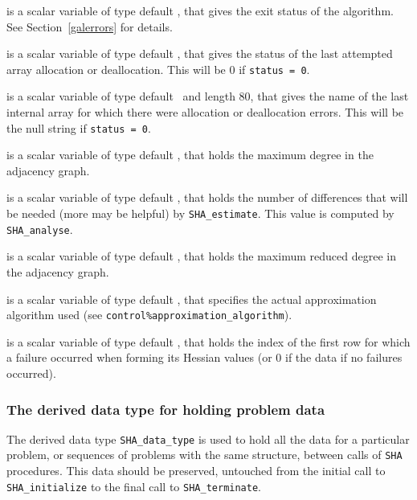 \documentclass{galahad}
\newcommand{\packagename}{SHA}
\begin{document}
\begin{description}
 is a scalar variable of type default \integer, that gives the
exit status of the algorithm. 
See Section~\ref{galerrors} for details.

 is a scalar variable of type default \integer, that gives
the status of the last attempted array allocation or deallocation.
This will be 0 if {\tt status = 0}.

 is a scalar variable of type default \character\
and length 80, that  gives the name of the last internal array 
for which there were allocation or deallocation errors.
This will be the null string if {\tt status = 0}. 

 is a scalar variable of type default \integer, 
that holds the maximum degree in the adjacency graph.

 is a scalar variable of type default \integer, 
that holds the number of differences that will be needed (more may be helpful)
by {\tt \packagename\_\-estimate}. This value is computed by
{\tt \packagename\_\-analyse}.

 is a scalar variable of type default \integer, 
that holds the maximum reduced degree in the adjacency graph.

  is a scalar variable of type 
default \integer, that specifies the actual approximation algorithm used
(see {\tt control\%approximation\_algorithm}).

 is a scalar variable of type default \integer, that holds the 
index of the first row for which a failure occurred when forming its Hessian
values (or 0 if the data if no failures occurred).

\end{description}


\subsubsection{The derived data type for holding problem data}\label{typedata}
The derived data type 
{\tt \packagename\_data\_type} 
is used to hold all the data for a particular problem,
or sequences of problems with the same structure, between calls of 
{\tt \packagename} procedures. 
This data should be preserved, untouched from the initial call to 
{\tt \packagename\_initialize}
to the final call to
{\tt \packagename\_terminate}.
\end{document}
